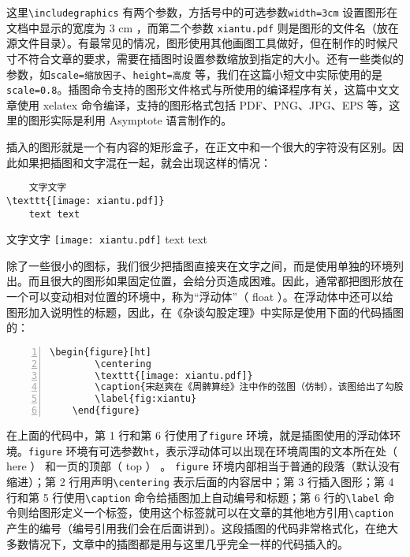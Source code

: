 这里\verb|\includegraphics| 有两个参数，方括号中的可选参数\verb|width=3cm| 设置图形在文档中显示的宽度为 3 cm ，而第二个参数 \verb|xiantu.pdf| 则是图形的文件名（放在源文件目录）。有最常见的情况，图形使用其他画图工具做好，但在制作的时候尺寸不符合文章的要求，需要在插图时设置参数缩放到指定的大小。还有一些类似的参数，如\verb|scale=缩放因子|、\verb|height=高度| 等，我们在这篇小短文中实际使用的是\verb|scale=0.8|。插图命令支持的图形文件格式与所使用的编译程序有关，这篇中文文章使用 xelatex 命令编译，支持的图形格式包括 PDF、PNG、JPG、EPS 等，这里的图形实际是利用 Asymptote 语言制作的。

插入的图形就是一个有内容的矩形盒子，在正文中和一个很大的字符没有区别。因此如果把插图和文字混在一起，就会出现这样的情况：

\begin{minipage}[t]{0.45\textwidth}
    \begin{lstlisting}
    文字文字
\texttt{[image: xiantu.pdf]}
    text text
    \end{lstlisting}
\end{minipage}
\hfill
\begin{minipage}[c]{0.45\textwidth}
    \vspace{0.1cm}
    \hspace{2.5cm}
    文字文字
    \texttt{[image: xiantu.pdf]}
    text text
\end{minipage}

除了一些很小的图标，我们很少把插图直接夹在文字之间，而是使用单独的环境列出。而且很大的图形如果固定位置，会给分页造成困难。因此，通常都把图形放在一个可以变动相对位置的环境中，称为“浮动体”（ float ）。在浮动体中还可以给图形加入说明性的标题，因此，在《杂谈勾股定理》中实际是使用下面的代码插图的：
\begin{lstlisting}[numbers=left]
    \begin{figure}[ht]
        \centering
        \texttt{[image: xiantu.pdf]}
        \caption{宋赵爽在《周髀算经》注中作的弦图（仿制），该图给出了勾股定理的一个极具对称美的证明。}
        \label{fig:xiantu}
    \end{figure}
\end{lstlisting}

在上面的代码中，第 1 行和第 6 行使用了\verb|figure| 环境，就是插图使用的浮动体环境。\verb|figure| 环境有可选参数\verb|ht|，表示浮动体可以出现在环境周围的文本所在处（ here ） 和一页的顶部（ top ） 。 \verb|figure| 环境内部相当于普通的段落（默认没有缩进）；第 2 行用声明\verb|\centering| 表示后面的内容居中；第 3 行插入图形；第 4 行和第 5 行使用\verb|\caption| 命令给插图加上自动编号和标题；第 6 行的\verb|\label| 命令则给图形定义一个标签，使用这个标签就可以在文章的其他地方引用\verb|\caption| 产生的编号（编号引用我们会在后面讲到）。这段插图的代码非常格式化，在绝大多数情况下，文章中的插图都是用与这里几乎完全一样的代码插入的。


